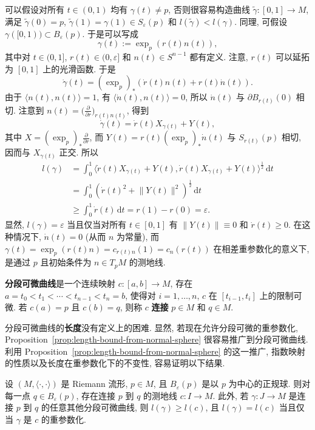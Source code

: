 \begin{RiemannProof}
可以假设对所有 $t\in(0,1)$ 均有 $\gamma(t)\ne p$, 否则很容易构造曲线 $\widetilde\gamma:[0,1]\to M$, 满足 $\widetilde\gamma(0)=p$, $\widetilde\gamma(1)=\gamma(1)\in S_\varepsilon(p)$ 和 $l(\widetilde\gamma)<l(\gamma)$. 同理, 可假设 $\gamma([0,1))\subset B_\varepsilon(p)$. 于是可以写成
\[
  \gamma(t):=\exp_p(r(t)n(t)),
\]
其中对 $t\in(0,1]$, $r(t)\in(0,\varepsilon]$ 和 $n(t)\in S^{n-1}$ 都有定义. 注意, $r(t)$ 可以延拓为 $[0,1]$ 上的光滑函数. 于是
\[
  \dot\gamma(t)=(\exp_p)_*(\dot r(t)n(t)+r(t)\dot n(t)).
\]
由于 $\langle n(t),n(t)\rangle=1$, 有 $\langle\dot n(t),n(t)\rangle=0$, 所以 $\dot n(t)$ 与 $\partial B_{r(t)}(0)$ 相切. 注意到 $n(t)=\bigl(\frac{\partial}{\partial r}\bigr)_{r(t)n(t)}$, 得到
\[
  \dot\gamma(t)=\dot r(t)X_{\gamma(t)}+Y(t),
\]
其中 $X=(\exp_p)_*\frac{\partial}{\partial r}$, 而 $Y(t)=r(t)(\exp_p)_*\dot n(t)$ 与 $S_{r(t)}(p)$ 相切, 因而与 $X_{\gamma(t)}$ 正交. 所以
\begin{align*}
  l(\gamma)
  &=\int_0^1\bigl\langle\dot r(t)X_{\gamma(t)}+Y(t),\dot r(t)X_{\gamma(t)}+Y(t)\bigr\rangle^{\frac12}\,\mathrm{d}t\\
  &=\int_0^1\left(\dot r(t)^2+\lVert Y(t)\rVert^2\right)^{\frac12}\,\mathrm{d}t\\
  &\geq\int_0^1\dot r(t)\,\mathrm{d}t=r(1)-r(0)=\varepsilon.
\end{align*}
显然, $l(\gamma)=\varepsilon$ 当且仅当对所有 $t\in[0,1]$ 有 $\lVert Y(t)\rVert\equiv0$ 和 $\dot r(t)\geq0$. 在这种情况下, $\dot n(t)=0$ (从而 $n$ 为常量), 而 $\gamma(t)=\exp_p(r(t)n)=c_{r(t)n}(1)=c_n(r(t))$ 在相差重参数化的意义下, 是通过 $p$ 且初始条件为 $n\in T_pM$ 的测地线.
\end{RiemannProof}

\begin{RiemannDefinition}\label{def:piecewise-differentiable-curve}
\textbf{分段可微曲线}是一个连续映射 $c:[a,b]\to M$, 存在 $a=t_0<t_1<\cdots<t_{n-1}<t_n=b$, 使得对 $i=1,\ldots,n$, $c$ 在 $[t_{i-1},t_i]$ 上的限制可微. 若 $c(a)=p$ 且 $c(b)=q$, 则称 $c$ \textbf{连接} $p\in M$ 和 $q\in M$.
\end{RiemannDefinition}

分段可微曲线的\textbf{长度}没有定义上的困难. 显然, 若现在允许分段可微的重参数化, Proposition~\ref{prop:length-bound-from-normal-sphere} 很容易推广到分段可微曲线. 利用 Proposition~\ref{prop:length-bound-from-normal-sphere} 的这一推广, 指数映射的性质以及长度在重参数化下的不变性, 容易证明以下结果.

\begin{RiemannTheorem}\label{thm:radial-geodesic-minimizes-length}
设 $(M,\langle\cdot,\cdot\rangle)$ 是 Riemann 流形, $p\in M$, 且 $B_\varepsilon(p)$ 是以 $p$ 为中心的正规球. 则对每一点 $q\in B_\varepsilon(p)$, 存在连接 $p$ 到 $q$ 的测地线 $c:I\to M$. 此外, 若 $\gamma:J\to M$ 是连接 $p$ 到 $q$ 的任意其他分段可微曲线, 则 $l(\gamma)\geq l(c)$, 且 $l(\gamma)=l(c)$ 当且仅当 $\gamma$ 是 $c$ 的重参数化.\hfill\openbox
\end{RiemannTheorem}

